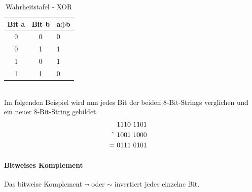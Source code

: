 \documentclass[12pt,a4paper]{scrartcl}
\numberwithin{equation}{section}
\numberwithin{myalgctr}{section}
\numberwithin{mytheoremctr}{section}
\newcommand*\BitNeg{\ensuremath{\mathord{\sim}}}
\newcommand{\mpar}[1]{\paragraph*{#1}\mbox{}\par}
\begin{document}
	\begin{table}[h!]
		\centering
		\begin{tabular}{|c|c|l|}
			\hline
			\rowcolor[HTML]{C0C0C0} 
			{\color[HTML]{000000} Bit a} & {\color[HTML]{000000} Bit b} & {\color[HTML]{000000} a$\oplus$b} \\ \hline
			\rowcolor[HTML]{EFEFEF} 
			0                            & 0                            & 0                             \\ \hline
			\rowcolor[HTML]{EFEFEF} 
			0                            & 1                            & 1                             \\ \hline
			\rowcolor[HTML]{EFEFEF} 
			1                            & 0                            & 1                             \\ \hline
			\rowcolor[HTML]{EFEFEF} 
			1                            & 1                            & 0                             \\ \hline
		\end{tabular}
		\caption{Wahrheitstafel - XOR}
	\end{table}\\
	Im folgenden Beispiel wird nun jedes Bit der beiden 8-Bit-Strings verglichen und ein neuer 8-Bit-String gebildet.
	\begin{align*}
	&1110~1101\\
	\textasciicircum~&1001~1000\\
	=~&0111~0101
	\end{align*}
	\mpar{Bitweises Komplement}\noindent
	Das bitweise Komplement $\neg$ oder $\BitNeg$ invertiert jedes einzelne Bit.
	
\end{document}
